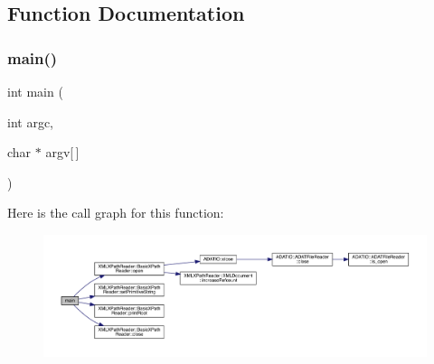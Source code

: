 \subsection{Function Documentation}
\mbox{\label{adat-devel_2other__libs_2xpath__reader_2examples_2replace__xpath_8cc_a0ddf1224851353fc92bfbff6f499fa97}} 
\subsubsection{\texorpdfstring{main()}{main()}}
{\footnotesize\ttfamily int main (\begin{DoxyParamCaption}\item[{int}]{argc,  }\item[{char $\ast$}]{argv\mbox{[}$\,$\mbox{]} }\end{DoxyParamCaption})}

Here is the call graph for this function\+:
\nopagebreak
\begin{figure}[H]
\begin{center}
\leavevmode
\includegraphics[width=350pt]{d3/ded/adat-devel_2other__libs_2xpath__reader_2examples_2replace__xpath_8cc_a0ddf1224851353fc92bfbff6f499fa97_cgraph}
\end{center}
\end{figure}
